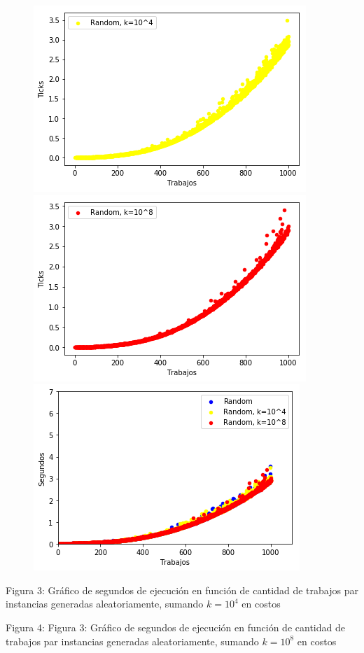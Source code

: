 \documentclass[A4paper,oneside,fleqn,11pt]{article}
\theoremstyle{definition}
\begin{document}
\begin{figure}[h!]
  \includegraphics[scale=0.4]{r4.png}
  \includegraphics[scale=0.4]{r8.png}
  \includegraphics[scale=0.4]{r48.png}
  
\end{figure}
\scriptsize{Figura 3: Gráfico de segundos de ejecución en función de cantidad de trabajos par instancias generadas aleatoriamente, sumando $k=10^4$ en costos}

\scriptsize{Figura 4: Figura 3: Gráfico de segundos de ejecución en función de cantidad de trabajos par instancias generadas aleatoriamente, sumando $k=10^8$ en costos}
\end{document}
